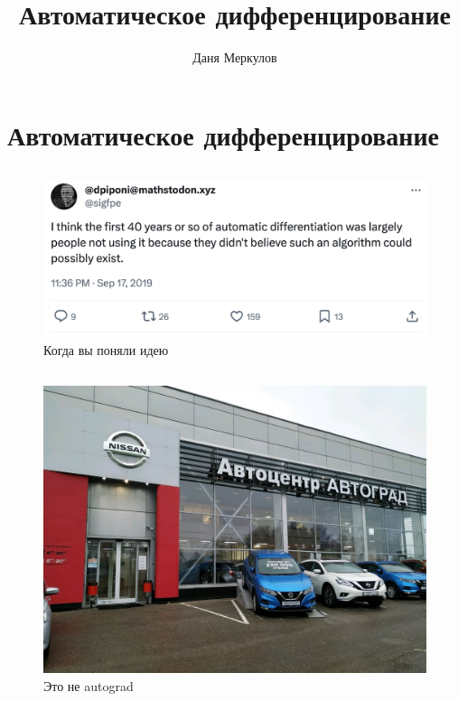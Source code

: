 \documentclass[
  russian,
  letterpaper,
  DIV=11,
  numbers=noendperiod]{scrartcl}
\title{Автоматическое дифференцирование}
\author{Даня Меркулов}
\date{}
\begin{document}
\maketitle


\section{Автоматическое
дифференцирование}\label{ux430ux432ux442ux43eux43cux430ux442ux438ux447ux435ux441ux43aux43eux435-ux434ux438ux444ux444ux435ux440ux435ux43dux446ux438ux440ux43eux432ux430ux43dux438ux435}

\subsection{}\label{section}

\begin{figure}[H]

{\centering \includegraphics[width=0.65\linewidth,height=\textheight,keepaspectratio]{autograd_expectations.jpeg}

}

\caption{Когда вы поняли идею}

\end{figure}%

\subsection{}\label{section-1}

\begin{figure}[H]

{\centering \includegraphics[width=0.45\linewidth,height=\textheight,keepaspectratio]{avtograd.jpeg}

}

\caption{Это не autograd}

\end{figure}%
\end{document}
